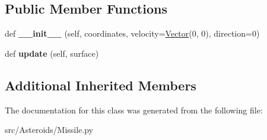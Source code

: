 \subsection*{Public Member Functions}
\begin{DoxyCompactItemize}
\item 
def {\bfseries \+\_\+\+\_\+init\+\_\+\+\_\+} (self, coordinates, velocity=\hyperlink{classVector_1_1Vector}{Vector}(0, 0), direction=0)\hypertarget{classMissile_1_1Missile_acd19b70b0fff20d2d1fb2e18c8455e93}{}\label{classMissile_1_1Missile_acd19b70b0fff20d2d1fb2e18c8455e93}

\item 
def {\bfseries update} (self, surface)\hypertarget{classMissile_1_1Missile_ab1ae0964e6012a269eedb97e906f9d58}{}\label{classMissile_1_1Missile_ab1ae0964e6012a269eedb97e906f9d58}

\end{DoxyCompactItemize}
\subsection*{Additional Inherited Members}


The documentation for this class was generated from the following file\+:\begin{DoxyCompactItemize}
\item 
src/\+Asteroids/Missile.\+py\end{DoxyCompactItemize}
